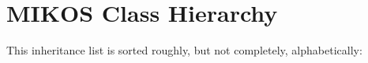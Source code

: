 \section{MIKOS Class Hierarchy}
This inheritance list is sorted roughly, but not completely, alphabetically:\begin{CompactList}
\item {}
\begin{CompactList}
\item {}
\end{CompactList}
\end{CompactList}

